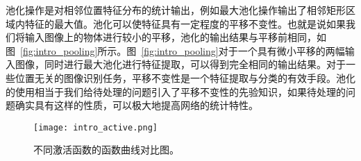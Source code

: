 池化操作是对相邻位置特征分布的统计输出，例如最大池化操作输出了相邻矩形区域内特征的最大值。池化可以使特征具有一定程度的平移不变性。也就是说如果我们将输入图像上的物体进行较小的平移，池化的输出结果与平移前相同，如图~\ref{fig:intro_pooling}所示。图~\ref{fig:intro_pooling}对于一个具有微小平移的两幅输入图像，同时进行最大池化进行特征提取，可以得到完全相同的输出结果。对于一些位置无关的图像识别任务，平移不变性是一个特征提取与分类的有效手段。池化的使用相当于我们给待处理的问题引入了平移不变性的先验知识，如果待处理的问题确实具有这样的性质，可以极大地提高网络的统计特性。

\begin{figure}
\centering
\texttt{[image: intro\_active.png]}
\caption{不同激活函数的函数曲线对比图。}
\label{fig:intro_active}
\end{figure}

